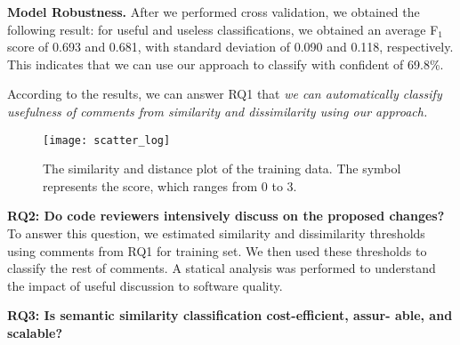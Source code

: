 \textbf{Model Robustness.} After we performed cross validation, we obtained the following result:
for useful and useless classifications,
we obtained an average F$_1$ score of 0.693 and 0.681,
with standard deviation of 0.090 and 0.118, respectively.
This indicates that we can use our approach to classify with confident of 69.8\%.

According to the results, we can answer  RQ1 that \textit{we can automatically classify usefulness of comments from similarity and dissimilarity using our approach.}



\begin{figure}[!t]
\centering
\texttt{[image: scatter\_log]}
\caption{The similarity and distance plot of the training data.
The symbol represents the score, which ranges from 0 to 3.}
\label{fig:scatter}
\end{figure}

\noindent \textbf{RQ2: Do code reviewers intensively discuss on the proposed changes?}\\
\indent To answer this question, we estimated similarity and dissimilarity thresholds using comments from RQ1 for training set. We then used these thresholds to classify the rest of comments. A statical analysis was performed to understand the impact of useful discussion to software quality.


\noindent \textbf{RQ3: Is semantic similarity classification cost-efficient, assur- able, and scalable?}\\


